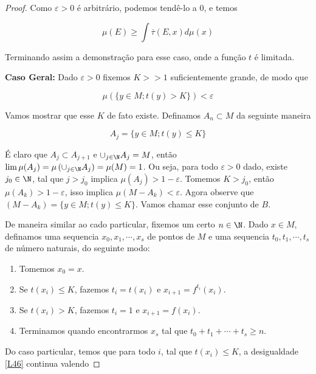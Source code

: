 \begin{proof}
Como $\varepsilon>0$ é arbitrário, podemos  tendê-lo a 0, e temos

\begin{equation*}
\mu(E)\geq\int\overline{\tau}(E,x)d\mu(x)
\end{equation*}\vspace{0.1cm}

Terminando assim a demonstração para esse caso, onde a função $t$ é limitada.

\textbf{Caso Geral:} Dado $\varepsilon>0$ fixemos $K>>1$ suficientemente grande, de modo que

\begin{equation*}
\mu\left(\big\{y\in M; t(y)>K\big\}\right)<\varepsilon
\end{equation*}\vspace{0.1cm}	

Vamos mostrar que esse $K$ de fato existe. Definamos $A_n\subset M$ da seguinte maneira

\begin{equation*}
A_j=\big\{y\in M; t(y)\leq K\big\}
\end{equation*}\vspace{0.1cm}

É claro que $A_j\subset A_{j+1}$ e $\cup_{j\in\N}A_j=M$, então $\lim\mu(A_j)=\mu\left(\cup_{j\in\N}A_j\right)=\mu(M)=1$. Ou seja, para todo $\varepsilon>0$ dado, existe $j_0\in\N$, tal que $j>j_0$ implica $\mu(A_j)>1-\varepsilon$. Tomemos $K>j_0$, então $\mu(A_k)>1-\varepsilon$, isso implica $\mu(M-A_k)<\varepsilon$. Agora observe que $(M-A_k)=\big\{y\in M; t(y)\leq K\big\}$. Vamos chamar esse conjunto de $B$. 

De maneira similar ao cado particular, fixemos um certo $n\in\N$. Dado $x \in M$, definamos uma sequencia $x_0,x_1,\cdots,x_s$ de pontos de $M$ e uma sequencia $t_0,t_1,\cdots,t_s$ de número naturais, do seguinte modo:

\begin{enumerate}
\item Tomemos $x_0=x$.
\item Se $t(x_i)\leq K$, fazemos $t_i=t(x_i)$ e $x_{i+1}=f^{t_i}(x_i)$.
\item Se $t(x_i)> K$, fazemos $t_i=1$ e $x_{i+1}=f(x_i)$.
\item Terminamos quando encontrarmos $x_s$ tal que $t_0+t_1+\cdots+t_s\geq n$.
\end{enumerate}

Do caso particular, temos que para todo $i$, tal que $t(x_i)\leq K$, a desigualdade \eqref{L46} continua valendo


\end{proof}
